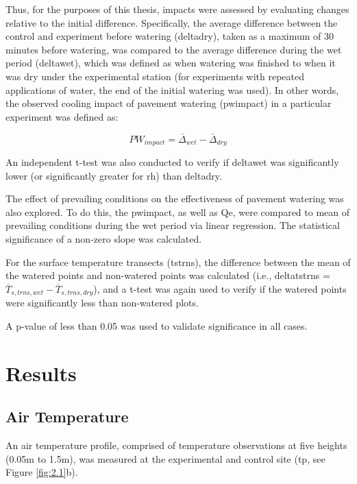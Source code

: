 \documentclass[final,3p,times,authoryear]{elsarticle}
\begin{document}
Thus, for the purposes of this thesis, impacts were assessed by evaluating changes
relative to the initial difference. Specifically, the average difference between the control
and experiment before watering (\gls{deltadry}), taken as a maximum of 30 minutes before
watering, was compared to the average difference during the wet period (\gls{deltawet}), which was defined as when watering was finished to when it was dry under the experimental
station (for experiments with repeated applications of water, the end of the initial
watering was used). In other words, the observed cooling impact of pavement watering
(\gls{pwimpact}) in a particular experiment was defined as:

\begin{equation}
PW_{impact} = \bar{\Delta}_{wet} - \bar{\Delta}_{dry}
\label{eq:2.2} 
\end{equation}

An independent t-test was also conducted to verify if \gls{deltawet} was significantly lower (or significantly greater for \gls{rh}) than \gls{deltadry}.

The effect of prevailing conditions on the effectiveness of pavement watering was also
explored. To do this, the \gls{pwimpact}, as well as \gls{Qe}, were compared to mean of prevailing conditions during the wet period via linear regression. The statistical significance of a non-zero slope was calculated.

For the surface temperature transects (\gls{tstrns}), the difference between the mean of the watered points and non-watered points was calculated (i.e., \gls{deltatstrns} = $\overline{T}_{s,trns,wet} - \overline{T}_{s,trns,dry}$), and a t-test was again used to verify if the watered points were significantly less than non-watered plots.

A \gls{p}-value of less than 0.05 was used to validate significance in all cases.

\section{Results}\label{sec:discussion3}
\subsection{Air Temperature}\label{sec:discussion3.1}

An air temperature profile, comprised of temperature observations at five heights (0.05m to 1.5m), was measured at the experimental and control site (\gls{tp}, see Figure \ref{fig:2.1}b).
\end{document}
